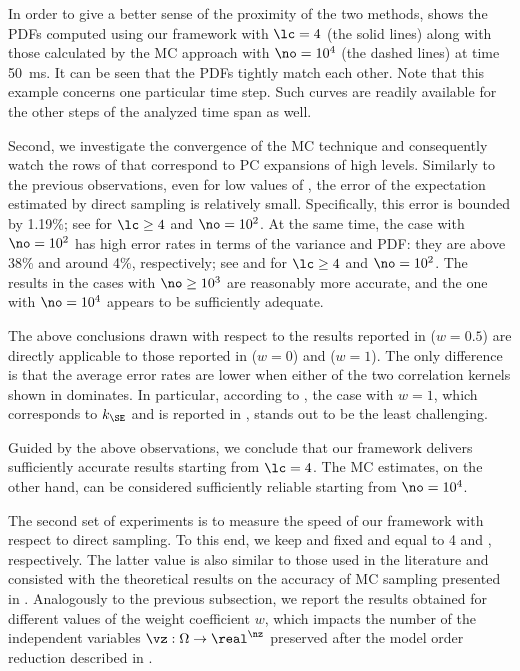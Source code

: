 In order to give a better sense of the proximity of the two methods,
 shows the \acp{PDF} computed using our
framework with $\lc = 4$ (the solid lines) along with those calculated by the
\ac{MC} approach with $\no = 10^4$ (the dashed lines) at time 50~ms. It can be
seen that the \acp{PDF} tightly match each other. Note that this example
concerns one particular time step. Such curves are readily available for the
other steps of the analyzed time span as well.

Second, we investigate the convergence of the \ac{MC} technique and consequently
watch the rows of  that correspond to \ac{PC}
expansions of high levels. Similarly to the previous observations, even for low
values of \no, the error of the expectation estimated by direct sampling is
relatively small. Specifically, this error is bounded by 1.19\%; see
\error{\expectation} for $\lc \geq 4$ and $\no = 10^2$. At the same time, the
case with $\no = 10^2$ has high error rates in terms of the variance and
\ac{PDF}: they are above 38\% and around 4\%, respectively; see
\error{\variance} and  for $\lc \geq 4$ and $\no = 10^2$. The results
in the cases with $\no \geq 10^3$ are reasonably more accurate, and the one with
$\no = 10^4$ appears to be sufficiently adequate.

The above conclusions drawn with respect to the results reported in
 ($w = 0.5$) are directly applicable to those
reported in  ($w = 0$) and
 ($w = 1$). The only difference is that the
average error rates are lower when either of the two correlation kernels shown
in  dominates. In particular, according to
\error{\variance}, the case with $w = 1$, which corresponds to $k_\SE$ and is
reported in , stands out to be the least
challenging.

Guided by the above observations, we conclude that our framework delivers
sufficiently accurate results starting from $\lc = 4$. The \ac{MC} estimates, on
the other hand, can be considered sufficiently reliable starting from $\no =
10^4$.


The second set of experiments is to measure the speed of our framework with
respect to direct sampling. To this end, we keep \lc and \no fixed and equal to
4 and , respectively. The latter value is also similar to those
used in the literature \cite{ghanta2006, bhardwaj2008, huang2009a, shen2009,
xiang2010, juan2012, lee2013} and consisted with the theoretical results on the
accuracy of \ac{MC} sampling presented in \cite{diaz-emparanza2002}. Analogously
to the previous subsection, we report the results obtained for different values
of the weight coefficient $w$, which impacts the number of the independent
variables $\vz: \Omega \to \real^\nz$ preserved after the model order reduction
described in .

